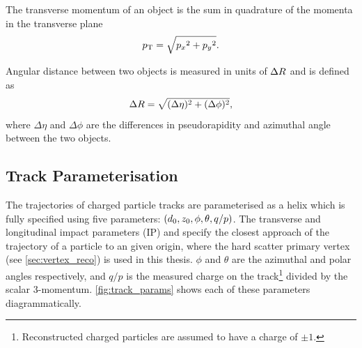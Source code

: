 The transverse momentum \pt of an object is the sum in quadrature of the momenta in the transverse plane
%
\begin{equation}\label{eq:pt}
  p_{\text{T}} = \sqrt{ {p_x}^2 + {p_y}^2 } .
\end{equation}

Angular distance between two objects is measured in units of $\Delta R$ and is defined as
%
\begin{equation}\label{eq:delta_r}
  \Delta R = \sqrt{(\Delta\eta)^{2} + (\Delta\phi)^{2}} ,
\end{equation}
%
where $\Delta \eta$ and $\Delta \phi$ are the differences in pseudorapidity and azimuthal angle between the two objects.


\subsection{Track Parameterisation}\label{sec:track_parameterisation}

The trajectories of charged particle tracks are parameterised as a helix which is fully specified using five parameters: $(d_{0}, z_{0}, \phi, \theta, q/p)$.
The transverse and longitudinal impact parameters (IP) \dzero and \zzero specify the closest approach of the trajectory of a particle to an given origin, where the hard scatter primary vertex (see \cref{sec:vertex_reco}) is used in this thesis.
$\phi$ and $\theta$ are the azimuthal and polar angles respectively, and $q/p$ is the measured charge on the track\footnote{Reconstructed charged particles are assumed to have a charge of $\pm 1$.} divided by the scalar 3-momentum.
\cref{fig:track_params} shows each of these parameters diagrammatically.


